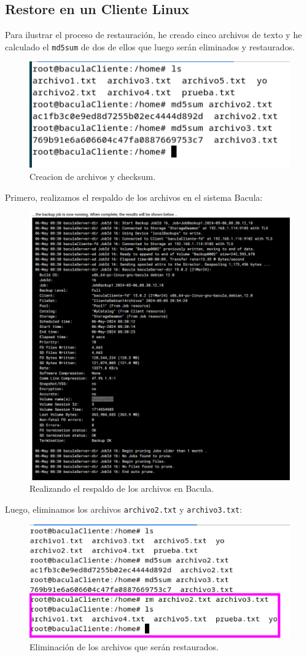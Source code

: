 \subsection{Restore en un Cliente Linux}

Para ilustrar el proceso de restauración, he creado cinco archivos de texto y he calculado el \texttt{md5sum} de dos de ellos que luego serán eliminados y restaurados.

\begin{figure}[H]
    \centering
    \includegraphics[width=0.5\linewidth]{instalacionBacula/5ARCHIVOS.png}
    \caption{Creacion de archivos y checksum.}
\end{figure}

Primero, realizamos el respaldo de los archivos en el sistema Bacula:
\begin{figure}[H]
    \centering
    \includegraphics[width=0.5\linewidth]{instalacionBacula/backup0002.png}
    \caption{Realizando el respaldo de los archivos en Bacula.}
\end{figure}

Luego, eliminamos los archivos \texttt{archivo2.txt} y \texttt{archivo3.txt}:
\begin{figure}[H]
    \centering
    \includegraphics[width=0.5\linewidth]{instalacionBacula/rmArchivo23.png}
    \caption{Eliminación de los archivos que serán restaurados.}
\end{figure}

